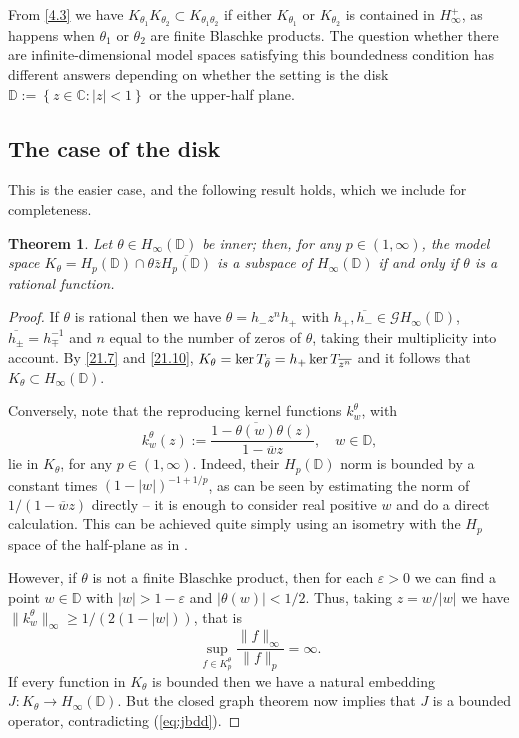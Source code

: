 \documentclass[11pt]{article}
\def\DD{\mathbb{D}}
\def\ker{\mathop{\rm ker}\nolimits}
\def\eps{\varepsilon}
\newtheorem{thm}{Theorem}[section]
\numberwithin{equation}{section}
\def\beginpf{\begin{proof}}
\def\endpf{\end{proof}}
\def\beq{\begin{equation}}
\def\eeq{\end{equation}}
\begin{document}
From \eqref{4.3} we have
$
K_{\theta_1}K_{\theta_2}  \subset K_{\theta_1\theta_2}$
if either $K_{\theta_1}$ or $K_{\theta_2}$ is contained in $H_\infty^+$, as happens when $\theta_1$ or $\theta_2$ are finite Blaschke products. The question whether there are infinite-dimensional model spaces satisfying this boundedness condition has different answers depending on  whether the setting is the disk $\mathbb{D}:=\left\{z\in \mathbb{C}:|z|<1\right\}$ or the upper-half plane.

\subsection{The case of the disk}

This is the easier case, and the following result holds, which we include for completeness.

\begin{thm}\label{thm:4.2}
Let $\theta \in H_\infty(\mathbb{D})$ be inner; then, for any $p\in (1,\infty)$, the model space $K_\theta=H_p(\mathbb{D}) \cap \theta \bar{z}\overline{H_p(\mathbb{D})}$ is a subspace of $H_\infty(\mathbb{D})$ if and only if $\theta$ is a rational function.
\end{thm}

\beginpf If $\theta$ is rational then we have $\theta=h_-z^nh_+$ with $h_+,\overline {h_-} \in \mathcal{G}H_\infty(\mathbb{D})$, $\overline{h_\pm}=h_\mp^{-1}$ and $n$ equal to the number of zeros of $\theta$, taking their multiplicity into account. By \eqref{21.7} and \eqref{21.10}, $K_\theta=\ker T_{\bar{\theta}}=h_+\ker T_{\overline{z^n}}$ and it follows that $K_\theta \subset H_\infty(\mathbb{D})$.

Conversely, note that the reproducing kernel functions $k_w^\theta$, with
\[
k_w^\theta(z):=\frac{1-\overline{\theta(w)}\theta(z)}{1-\overline w z},\quad w\in \mathbb{D},
\]
lie in  $K_\theta$, for any $p\in (1,\infty)$.
Indeed, their $H_p(\mathbb{D})$ norm is bounded by a constant times $(1-|w|)^{-1+1/p}$, as can be seen by estimating the norm of
$1/(1-\overline w z)$ directly -- it is enough to consider real positive $w$ and do a direct calculation. This can be
achieved quite simply using an isometry with the $H_p$ space of the half-plane as in \cite[Prop. 2.15]{jrp-hankel}.

However, if $\theta$ is not a finite Blaschke product, then for each $\eps>0$ we can find a point $w\in \mathbb{D}$ with $|w|> 1-\eps$ and
$|\theta(w)|<1/2$. Thus, taking $z=w/|w|$ we have $\|k^\theta_w\|_\infty \ge 1/(2(1-|w|))$, that is
\beq\label{eq:jbdd}
\sup_{f \in K^\theta_p} \frac{ \|f\|_\infty }{ \|f\|_p} = \infty.
\eeq
If every function in $K_\theta$ is bounded then we have a natural embedding $J: K_\theta \to H_\infty(\DD)$. 
But the closed graph theorem now implies that $J$ is
a bounded operator, contradicting (\ref{eq:jbdd}).
\endpf
\end{document}
